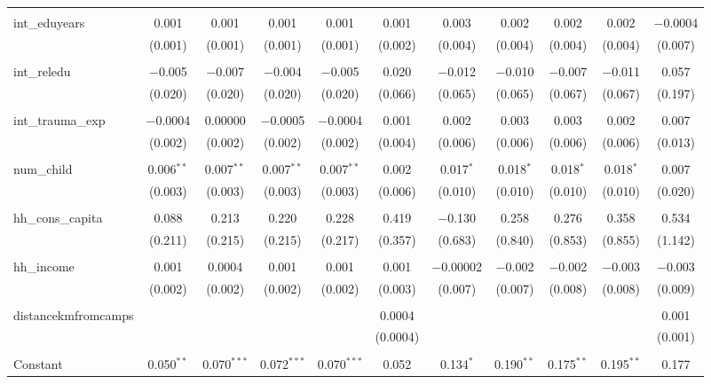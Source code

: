 \begin{table}[H]
\begin{tabular}{@{\extracolsep{4pt}}lcccccccccc}
  & & & & & & & & & & \\ 
 int\_eduyears & 0.001 & 0.001 & 0.001 & 0.001 & 0.001 & 0.003 & 0.002 & 0.002 & 0.002 & $-$0.0004 \\ 
  & (0.001) & (0.001) & (0.001) & (0.001) & (0.002) & (0.004) & (0.004) & (0.004) & (0.004) & (0.007) \\ 
  & & & & & & & & & & \\ 
 int\_reledu & $-$0.005 & $-$0.007 & $-$0.004 & $-$0.005 & 0.020 & $-$0.012 & $-$0.010 & $-$0.007 & $-$0.011 & 0.057 \\ 
  & (0.020) & (0.020) & (0.020) & (0.020) & (0.066) & (0.065) & (0.065) & (0.067) & (0.067) & (0.197) \\ 
  & & & & & & & & & & \\ 
 int\_trauma\_exp & $-$0.0004 & 0.00000 & $-$0.0005 & $-$0.0004 & 0.001 & 0.002 & 0.003 & 0.003 & 0.002 & 0.007 \\ 
  & (0.002) & (0.002) & (0.002) & (0.002) & (0.004) & (0.006) & (0.006) & (0.006) & (0.006) & (0.013) \\ 
  & & & & & & & & & & \\ 
 num\_child & 0.006$^{**}$ & 0.007$^{**}$ & 0.007$^{**}$ & 0.007$^{**}$ & 0.002 & 0.017$^{*}$ & 0.018$^{*}$ & 0.018$^{*}$ & 0.018$^{*}$ & 0.007 \\ 
  & (0.003) & (0.003) & (0.003) & (0.003) & (0.006) & (0.010) & (0.010) & (0.010) & (0.010) & (0.020) \\ 
  & & & & & & & & & & \\ 
 hh\_cons\_capita & 0.088 & 0.213 & 0.220 & 0.228 & 0.419 & $-$0.130 & 0.258 & 0.276 & 0.358 & 0.534 \\ 
  & (0.211) & (0.215) & (0.215) & (0.217) & (0.357) & (0.683) & (0.840) & (0.853) & (0.855) & (1.142) \\ 
  & & & & & & & & & & \\ 
 hh\_income & 0.001 & 0.0004 & 0.001 & 0.001 & 0.001 & $-$0.00002 & $-$0.002 & $-$0.002 & $-$0.003 & $-$0.003 \\ 
  & (0.002) & (0.002) & (0.002) & (0.002) & (0.003) & (0.007) & (0.007) & (0.008) & (0.008) & (0.009) \\ 
  & & & & & & & & & & \\ 
 distancekmfromcamps &  &  &  &  & 0.0004 &  &  &  &  & 0.001 \\ 
  &  &  &  &  & (0.0004) &  &  &  &  & (0.001) \\ 
  & & & & & & & & & & \\ 
 Constant & 0.050$^{**}$ & 0.070$^{***}$ & 0.072$^{***}$ & 0.070$^{***}$ & 0.052 & 0.134$^{*}$ & 0.190$^{**}$ & 0.175$^{**}$ & 0.195$^{**}$ & 0.177 \\ 

\end{tabular}
\end{table}
